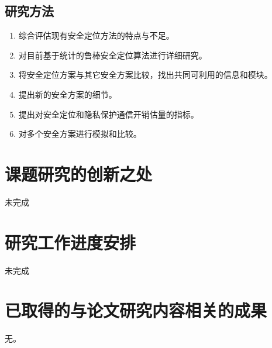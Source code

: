 \documentclass[a4paper,10pt]{article}
\begin{document}
\subsection{研究方法}

\begin{enumerate}

\item 综合评估现有安全定位方法的特点与不足。

\item 对目前基于统计的鲁棒安全定位算法进行详细研究。

\item 将安全定位方案与其它安全方案比较，找出共同可利用的信息和模块。

\item 提出新的安全方案的细节。

\item 提出对安全定位和隐私保护通信开销估量的指标。

\item 对多个安全方案进行模拟和比较。

\end{enumerate}


\section{课题研究的创新之处}

未完成

\section{研究工作进度安排}

未完成

\section{已取得的与论文研究内容相关的成果} 

无。



\end{document}
